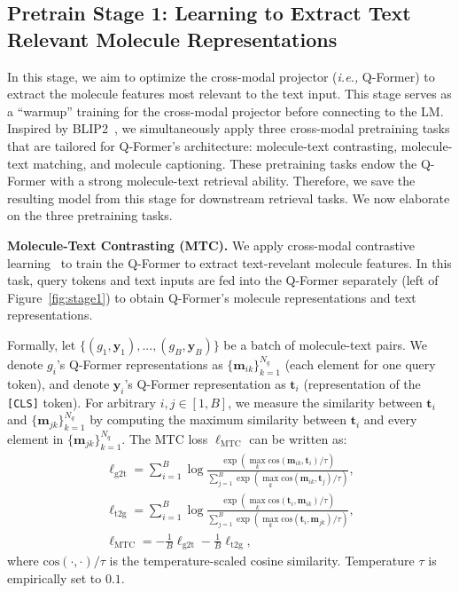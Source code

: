 \documentclass[11pt]{article}
\newcommand{\ie}{\emph{i.e., }}
\newcommand{\Vtr}[1]{\boldsymbol{#1}}
\begin{document}
\subsection{Pretrain Stage 1: Learning to Extract Text Relevant Molecule Representations}
In this stage, we aim to optimize the cross-modal projector (\ie Q-Former) to extract the molecule features most relevant to the text input. This stage serves as a ``warmup'' training for the cross-modal projector before connecting to the LM. Inspired by BLIP2~\cite{BLIP2}, we simultaneously apply three cross-modal pretraining tasks that are tailored for Q-Former's architecture: molecule-text contrasting, molecule-text matching, and molecule captioning. These pretraining tasks endow the Q-Former with a strong molecule-text retrieval ability. Therefore, we save the resulting model from this stage for downstream retrieval tasks. We now elaborate on the three pretraining tasks. 



\textbf{Molecule-Text Contrasting (MTC).} We apply cross-modal contrastive learning~\citep{CLIP} to train the Q-Former to extract text-revelant molecule features. 
In this task, query tokens and text inputs are fed into the Q-Former separately (left of Figure~\ref{fig:stage1}) to obtain Q-Former's molecule representations and text representations.





Formally, let $\{(g_1, \Vtr{y}_1), ..., (g_B, \Vtr{y}_B)\}$ be a batch of molecule-text pairs. We denote $g_i$'s Q-Former representations as $\{\Vtr{m}_{ik}\}_{k=1}^{N_q}$ (each element for one query token), and denote $\Vtr{y}_i$'s Q-Former representation as $\Vtr{t}_{i}$ (representation of the \texttt{[CLS]} token).
For arbitrary $i,j\in [1,B]$, we measure the similarity between $\Vtr{t}_i$ and $\{\Vtr{m}_{jk}\}_{k=1}^{N_q}$ by computing the maximum similarity between $\Vtr{t}_{i}$ and every element in $\{\Vtr{m}_{jk}\}_{k=1}^{N_q}$. The MTC loss $\ell_{\text{MTC}}$ can be written as:
\begin{gather}
 \nonumber \ell_{\text{g2t}} = \sum_{i=1}^{B} \log \frac{\exp(\max_k \text{cos}(\Vtr{m}_{ik}, \Vtr{t}_{i})/\tau)}{\sum_{j=1}^B \exp(\max_k \text{cos}(\Vtr{m}_{ik}, \Vtr{t}_{j})/\tau)}, \\
 \nonumber \ell_{\text{t2g}} = \sum_{i=1}^{B} \log \frac{\exp(\max_k \text{cos}(\Vtr{t}_{i}, \Vtr{m}_{ik})/\tau)}{\sum_{j=1}^B \exp(\max_k \text{cos}(\Vtr{t}_{i}, \Vtr{m}_{jk})/\tau)}, \\
 \ell_{\text{MTC}} = - \frac{1}{B}\ell_{\text{g2t}} - \frac{1}{B}\ell_{\text{t2g}},
\end{gather}
where $\text{cos}(\cdot,\cdot)/\tau$ is the temperature-scaled cosine similarity. Temperature $\tau$ is empirically set to $0.1$.
\end{document}
